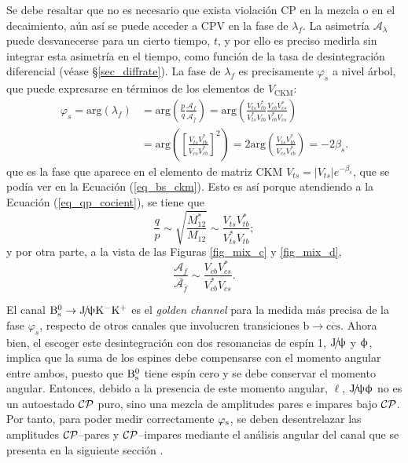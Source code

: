 Se debe resaltar que no es necesario que exista violación CP en la mezcla o en el decaimiento, aún así se puede acceder a CPV en la fase de $\lambda_f$. La asimetría $\mathscr{A}_{\lambda}$ puede desvanecerse para un cierto tiempo, $t$, y por ello es preciso medirla sin integrar esta asimetría en el tiempo, como función de la tasa de desintegración diferencial (véase \S \ref{sec_diffrate}). La fase de $\lambda_f$ es precisamente $\varphi_s$ \color{vero} a nivel árbol, \color{norm} que puede expresarse en términos de los elementos de $V_{\text{CKM}}$:
\begin{equation}
\begin{split}
  \varphi_s = \text{arg} (\lambda_f) & =  \text{arg}\left(\frac{p}{q}  \frac{\mathcal{A}_f}{\overline{\mathcal{A}_{\bar{f}}}}\right) =   \text{arg}\left(\frac{V_{ts}V_{tb}^*}{V_{ts}^*V_{tb}} \frac{V_{cb}V_{cs}^*}{V_{cb}^*V_{cs}} \right) \\ &=   \text{arg} \left(  \left[ \frac{V_{ts} V_{tb}^*}{V_{cs} V_{cb}^*}  \right]^2  \right) = 2 \text{arg} \left(   \frac{V_{ts} V_{tb}^*}{V_{cs} V_{cb}^*}    \right)  =  - 2\beta_s.
\end{split}
\end{equation}
que es la fase que aparece en el elemento de matriz \textsc{CKM} $V_{ts} = |V_{ts}| e^{- \beta_s}$, que se podía ver en la Ecuación (\ref{eq_bs_ckm}).
%
Esto es así porque atendiendo a la Ecuación (\ref{eq_qp_cocient}), se tiene que
\[\frac{q}{p} \sim \sqrt{\frac {M_{12}^*} {M_{12}} } \sim \frac{V_{ts}V_{tb}^*}{V_{ts}^*V_{tb}}; \]
y por otra parte, a la vista de las Figuras \ref{fig_mix_c} y \ref{fig_mix_d},
\[\frac{\mathcal{A}_f}{\overline{\mathcal{A}_{\bar{f}}}} \sim \frac{V_{cb}V_{cs}^*}{V_{cb}^*V_{cs}}.\]



El canal $\mathrm{B}{}_{\mathrm{s}}^{0} \rightarrow \mathrm{J}\!/\!\uppsi \mathrm{K}{}^{-} \mathrm{K}{}^{+}$ es el \emph{golden channel} para la medida más precisa de la fase $\varphi_s$, respecto de otros canales que involucren transiciones $\mathrm{b \rightarrow c\overline{c}s}$. Ahora bien, el escoger este desintegración con dos resonancias de \color{vero} espín 1, \color{norm} $\mathrm{J}\!/\!\uppsi$ y $\upphi$, implica que la suma de los espines debe compensarse con el momento angular entre ambos, puesto que $\mathrm{B}{}_{\mathrm{s}}^{0}$ tiene espín cero y se debe conservar el momento angular. Entonces, debido a la presencia de este momento angular, $\ell$, $\mathrm{J}\!/\!\uppsi \upphi$ no es un autoestado $\mathcal{CP}$ puro, sino una mezcla de amplitudes pares e impares bajo $\mathcal{CP}$. Por tanto, para poder medir correctamente $\varphi_{\mathrm{s}}$, se deben desentrelazar las amplitudes $\mathcal{CP}$--pares y $\mathcal{CP}$--impares mediante el análisis angular del canal que se presenta en la siguiente sección \cite{paperPhis}.



